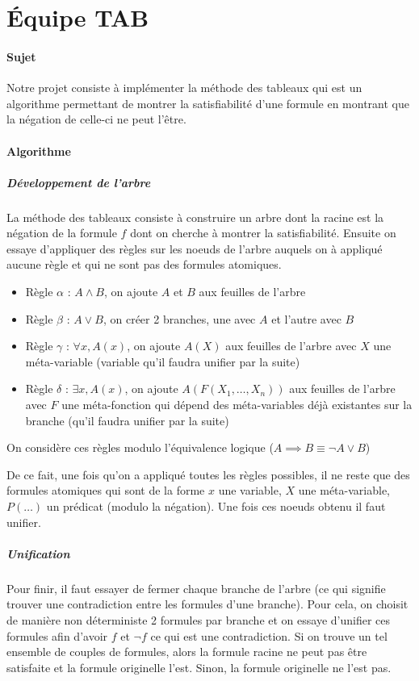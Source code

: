 \documentclass{report}
\title{}
\author{}
\date{\today}
\begin{document}
\section{Équipe TAB}

\paragraph{Sujet}
Notre projet consiste à implémenter la méthode des tableaux qui est un algorithme permettant de montrer la satisfiabilité d'une formule en montrant que la négation de celle-ci ne peut l'être.

\paragraph{Algorithme}

\subparagraph{Développement de l'arbre}
La méthode des tableaux consiste à construire un arbre dont la racine est la négation de la formule $f$ dont on cherche à montrer la satisfiabilité. Ensuite on essaye d'appliquer des règles sur les noeuds de l'arbre auquels on à appliqué aucune règle et qui ne sont pas des formules atomiques.

\begin{itemize}
  \item Règle $\alpha$ : $A \land B$, on ajoute $A$ et $B$ aux feuilles de l'arbre
  \item Règle $\beta$ : $A \lor B$, on créer 2 branches, une avec $A$ et l'autre avec $B$
  \item Règle $\gamma$ : $\forall x, A(x)$, on ajoute $A(X)$ aux feuilles de l'arbre avec $X$ une méta-variable (variable qu'il faudra unifier par la suite)
  \item Règle $\delta$ : $\exists x, A(x)$, on ajoute $A(F(X_1, \ldots, X_n))$ aux feuilles de l'arbre avec $F$ une méta-fonction qui dépend des méta-variables déjà existantes sur la branche (qu'il faudra unifier par la suite)
\end{itemize}

On considère ces règles modulo l'équivalence logique ($A \implies B \equiv \neg A \lor B$)

De ce fait, une fois qu'on a appliqué toutes les règles possibles, il ne reste que des formules atomiques qui sont de la forme $x$ une variable, $X$ une méta-variable, $P(\ldots)$ un prédicat (modulo la négation). Une fois ces noeuds obtenu il faut unifier.

\subparagraph{Unification}
Pour finir, il faut essayer de fermer chaque branche de l'arbre (ce qui signifie trouver une contradiction entre les formules d'une branche). Pour cela, on choisit de manière non déterministe 2 formules par branche et on essaye d'unifier ces formules afin d'avoir $f$ et $\lnot f$ ce qui est une contradiction. Si on trouve un tel ensemble de couples de formules, alors la formule racine ne peut pas être satisfaite et la formule originelle l'est. Sinon, la formule originelle ne l'est pas.
\end{document}
